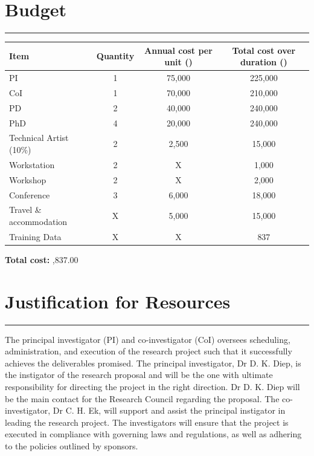 \documentclass[a4paper, 11pt, onecolumn]{article} %
\numberwithin{equation}{section} %
\numberwithin{figure}{section} %
\numberwithin{table}{section} %
\begin{document}



\newpage

\section*{Budget}
\hrule\vspace{0.5em}

\begin{table}[!h]
	\centering
	{\renewcommand{\arraystretch}{1.8} %
	\begin{tabular}{|l|c|c|c|}
		\hline
		Item		& Quantity	& Annual cost per unit (\textsterling)	& Total cost over duration (\textsterling)\\
		\hline
		PI			& 1			& 75,000				& 225,000\\
		\hline
		CoI			& 1			& 70,000				& 210,000\\
		\hline
		PD			& 2			& 40,000				& 240,000\\
		\hline
		PhD			& 4			& 20,000				& 240,000\\
		\hline
		Technical Artist (10\%) & 2 & 2,500				& 15,000\\
		\hline
		Workstation	& 2			& X						& 1,000\\		
		\hline
		Workshop	& 2			& X						& 2,000\\		
		\hline
		Conference	& 3			& 6,000					& 18,000\\		
		\hline
		Travel \& accommodation & X	& 5,000				& 15,000\\		
		\hline
		Training Data& X		& X						& 837\\
		\hline
	\end{tabular}
	}
\end{table}

\vspace{1cm}

\textbf{Total cost:} ,837.00

\newpage

\section*{Justification for Resources}
\hrule\vspace{0.5em}

The principal investigator (PI) and co-investigator (CoI) oversees scheduling, administration, and execution of the research project such that it successfully achieves the deliverables promised.
The principal investigator, Dr D. K. Diep, is the instigator of the research proposal and will be the one with ultimate responsibility for directing the project in the right direction. Dr D. K. Diep will be the main contact for the Research Council regarding the proposal.
The co-investigator, Dr C. H. Ek, will support and assist the principal instigator in leading the research project.
The investigators will ensure that the project is executed in compliance with governing laws and regulations, as well as adhering to the policies outlined by sponsors.
\end{document}
